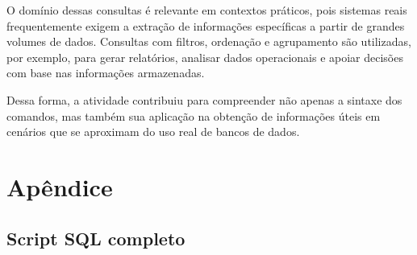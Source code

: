 \documentclass[12pt,a4paper]{article}
\begin{document}
O domínio dessas consultas é relevante em contextos práticos, pois sistemas reais frequentemente exigem a extração de informações específicas a partir de grandes volumes de dados. Consultas com filtros, ordenação e agrupamento são utilizadas, por exemplo, para gerar relatórios, analisar dados operacionais e apoiar decisões com base nas informações armazenadas.

Dessa forma, a atividade contribuiu para compreender não apenas a sintaxe dos comandos, mas também sua aplicação na obtenção de informações úteis em cenários que se aproximam do uso real de bancos de dados.

\section{Apêndice}

\subsection{Script SQL completo}


\end{document}
